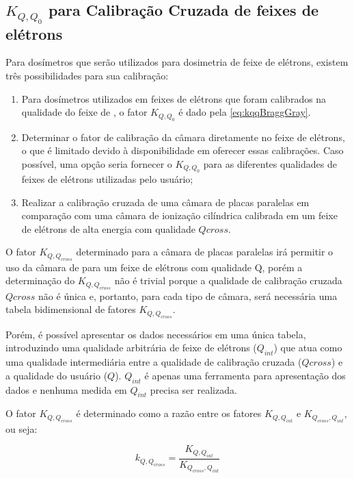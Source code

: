 \documentclass[11pt,a4paper]{article}
\begin{document}
	\subsection{$K_{Q,Q_0}$ para Calibração Cruzada de feixes de elétrons}

		Para dosímetros que serão utilizados para dosimetria de feixe de elétrons, existem três possibilidades para sua calibração:

		\begin{enumerate}
			\item Para dosímetros utilizados em feixes de elétrons que foram calibrados na qualidade do feixe de , o fator $K_{Q,Q_0}$ é dado pela \ref{eq:kqqBraggGray}. 
			
			\item Determinar o fator de calibração da câmara diretamente no feixe de elétrons, o que é limitado devido à disponibilidade em oferecer essas calibrações. Caso possível, uma opção seria fornecer o $K_{Q,Q_0}$ para as diferentes qualidades de feixes de elétrons utilizadas pelo usuário;
			
			\item Realizar a calibração cruzada de uma câmara de placas paralelas em comparação com uma câmara de ionização cilíndrica calibrada em um feixe de elétrons de alta energia com qualidade $Q{cross}$. 
		\end{enumerate}

		O fator $K_{Q,Q_{cross}}$ determinado para a câmara de placas paralelas irá permitir o uso da câmara de para um feixe de elétrons com qualidade Q, porém a determinação do $K_{Q,Q_{cross}}$ não é trivial porque a qualidade de calibração cruzada $Q{cross}$ não é única e, portanto, para cada tipo de câmara, será necessária uma tabela bidimensional de fatores $K_{Q,Q_{cross}}$.

		Porém, é possível apresentar os dados necessários em uma única tabela, introduzindo uma qualidade arbitrária de feixe de elétrons ($Q_{int}$) que atua como uma qualidade intermediária entre a qualidade de calibração cruzada ($Q{cross}$) e a qualidade do usuário ($Q$). $Q_{int}$ é apenas uma ferramenta para apresentação dos dados e nenhuma medida em $Q_{int}$ precisa ser realizada. 

		O fator $K_{Q,Q_{cross}}$ é determinado como a razão entre os fatores $K_{Q,Q_{int}}$ e $K_{Q_{cross},Q_{int}}$, ou seja:

			\begin{equation}
				k_{Q,Q_{cross}} = \frac{K_{Q,Q_{int}}}{K_{Q_{cross},Q_{int}}}
				\label{eq:kqqcross}
			\end{equation}
\end{document}
